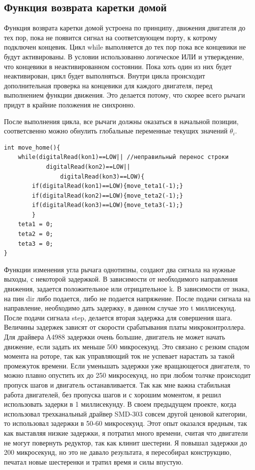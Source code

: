 \subsection{Функция возврата каретки домой}

Функция возврата каретки домой устроена по принципу, движения двигателя до тех пор, пока не появится сигнал на соответсвующем порту, к котрому подключен концевик. Цикл while выполняется до тех пор пока все концевики не будут активированы. В условии использованно логическое ИЛИ и утверждение, что концевики в неактивированном состоянии. Пока хоть один из них будет неактивирован, цикл будет выполняться. Внутри цикла происходит дополнительная проверка на концевики для каждого двигателя, перед выполнением функции движения. Это делается потому, что скорее всего рычаги придут в крайние положения не синхронно.

После выполнения цикла, все рычаги должны оказаться в начальной позиции, соответсвенно можно обнулить глобальные переменные текущих значений $\theta_{i}$.

\begin{lstlisting}[style=uno,caption=Функция возврата каретки домой]
int move_home(){
    while(digitalRead(kon1)==LOW|| //неправильный перенос строки
            digitalRead(kon2)==LOW||
                digitalRead(kon3)==LOW){
        if(digitalRead(kon1)==LOW){move_teta1(-1);}
        if(digitalRead(kon2)==LOW){move_teta2(-1);}
        if(digitalRead(kon3)==LOW){move_teta3(-1);}
        }
    teta1 = 0;
    teta2 = 0;
    teta3 = 0;
}
\end{lstlisting}

Функции изменения угла рычага однотипны, создают два сигнала на нужные выходы, с некоторой задержкой. В зависимости от необходимого направления движения, задается положительное или отрицательное k. В зависимости от знака, на пин dir либо подается, либо не подается напряжение. После подачи сигнала на направление, необходимо дать задержку, в данном случае это t миллисекунд. После подачи сигнала step, делается вторая задержка для совершения шага. Величины задержек зависят от скорости срабатывания платы микроконтроллера. Для драйвера A4988 задержки очень большие, двигатель не может начать движение, если задать их меньше 500 микросекунд. Это связано с резким спадом момента на роторе, так как управляющий ток не успевает нарастать за такой промежуток времени. Если уменьшать задержки уже вращающегося двигателя, то можно плавно опустить их до 250 микросекунд, но при любом толчке происходит пропуск шагов и двигатель останавливается. Так как мне важна стабильная работа двигателей, без пропуска шагов и с хорошим моментом, я решил использовать задерки в 1 миллисекунду. В своем предыдущем проекте, когда использовал трехканальный драйвер SMD-303 совсем другой ценовой категории, то использовал задержки в 50-60 микросекунд. Этот опыт оказался вредным, так как выставляя низкие задержки, я потратил много времени, считая что двигатели не могут повернуть редуктор, так как клинит шестерни. Я повышал задержки до 200 микросекунд, но это не давало результата, я пересобирал конструкцию, печатал новые шестеренки и тратил время и силы впустую.   

